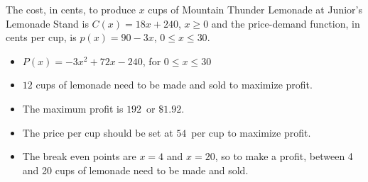 {The cost, in cents, to produce $x$ cups of Mountain Thunder Lemonade at Junior's Lemonade Stand  is $C(x) = 18x + 240$, $x \geq 0$ and the price-demand function, in cents per cup,  is $p(x) = 90-3x$, $0 \leq x \leq 30$.}
{\begin{itemize}

\item  $P(x) = -3x^2+72x-240$, for $0 \leq x \leq 30$

\item  $12$ cups of lemonade need to be made and sold to maximize profit.

\item  The maximum profit is $192$\textcent \, or $\$1.92$.

\item  The price per cup should be set at $54$\textcent \, per cup to maximize profit.

\item  The break even points are $x=4$ and $x=20$, so to make a profit, between 4 and 20 cups of lemonade need to be made and sold.


\end{itemize}
}